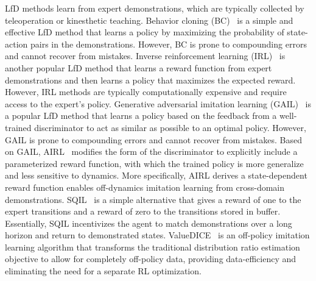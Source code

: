 LfD methods learn from expert demonstrations, which are typically collected by teleoperation or kinesthetic teaching. 
Behavior cloning (BC)~\cite{pomerleau1989alvinn,bojarski2016end} is a simple and effective LfD method that learns a policy by maximizing the probability of state-action pairs in the demonstrations. However, BC is prone to compounding errors and cannot recover from mistakes. 
Inverse reinforcement learning (IRL)~\cite{ng2000algorithms,abbeel2004apprenticeship} is another popular LfD method that learns a reward function from expert demonstrations and then learns a policy that maximizes the expected reward. However, IRL methods are typically computationally expensive and require access to the expert's policy. 
Generative adversarial imitation learning (GAIL)~\cite{ho2016generative} is a popular LfD method that learns a policy based on the feedback from a well-trained discriminator to act as similar as possible to an optimal policy. However, GAIL is prone to compounding errors and cannot recover from mistakes. 
Based on GAIL, AIRL~\citep{fu2017learning} modifies the form of the discriminator to explicitly include a parameterized reward function, with which the trained policy is more generalize and less sensitive to dynamics. More specifically, AIRL derives a state-dependent reward function enables off-dynamics imitation learning from cross-domain demonstrations.
SQIL~\citep{reddy2019sqil} is a simple alternative that gives a reward of one to the expert transitions and a reward of zero to the transitions stored in buffer. Essentially, SQIL incentivizes the agent to match demonstrations over a long horizon and return to demonstrated states.
ValueDICE~\citep{kostrikov2019imitation} is an off-policy imitation learning algorithm that transforms the traditional distribution ratio estimation objective to allow for completely off-policy data, providing data-efficiency and eliminating the need for a separate RL optimization.

